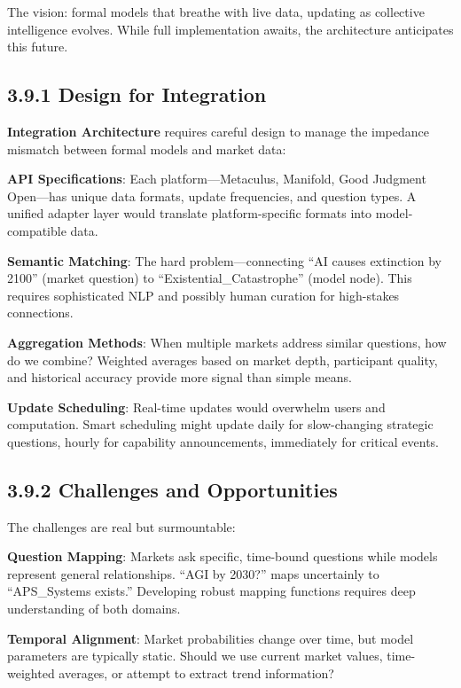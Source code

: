 \documentclass[
  11pt,
  letterpaper,
  openany]{book}
\begin{document}
The vision: formal models that breathe with live data, updating as
collective intelligence evolves. While full implementation awaits, the
architecture anticipates this future.

\subsection{3.9.1 Design for Integration}\label{sec-integration-design}

\textbf{Integration Architecture} requires careful design to manage the
impedance mismatch between formal models and market data:

\textbf{API Specifications}: Each platform---Metaculus, Manifold, Good
Judgment Open---has unique data formats, update frequencies, and
question types. A unified adapter layer would translate
platform-specific formats into model-compatible data.

\textbf{Semantic Matching}: The hard problem---connecting ``AI causes
extinction by 2100'' (market question) to ``Existential\_Catastrophe''
(model node). This requires sophisticated NLP and possibly human
curation for high-stakes connections.

\textbf{Aggregation Methods}: When multiple markets address similar
questions, how do we combine? Weighted averages based on market depth,
participant quality, and historical accuracy provide more signal than
simple means.

\textbf{Update Scheduling}: Real-time updates would overwhelm users and
computation. Smart scheduling might update daily for slow-changing
strategic questions, hourly for capability announcements, immediately
for critical events.

\subsection{3.9.2 Challenges and
Opportunities}\label{sec-market-challenges}

The challenges are real but surmountable:

\textbf{Question Mapping}: Markets ask specific, time-bound questions
while models represent general relationships. ``AGI by 2030?'' maps
uncertainly to ``APS\_Systems exists.'' Developing robust mapping
functions requires deep understanding of both domains.

\textbf{Temporal Alignment}: Market probabilities change over time, but
model parameters are typically static. Should we use current market
values, time-weighted averages, or attempt to extract trend information?
\end{document}
